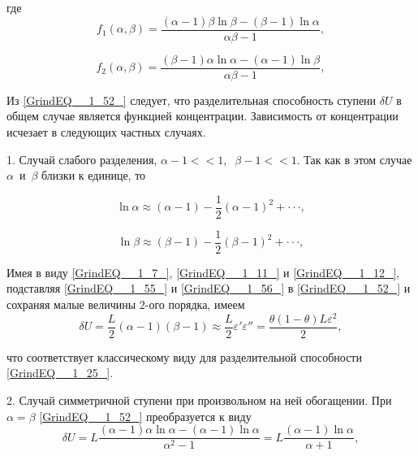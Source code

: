 где
\begin{equation} \label{GrindEQ__1_53_} 
  f_{1} (\alpha ,\beta )=\frac{(\alpha -1)\beta \ln \beta -(\beta -1)\ln \alpha }{\alpha \beta -1} ,  
\end{equation} 

\begin{equation} \label{GrindEQ__1_54_} 
f_{2} (\alpha ,\beta )=\frac{(\beta -1)\alpha \ln \alpha -(\alpha -1)\ln \beta }{\alpha \beta -1} ,  
\end{equation} 

Из \ref{GrindEQ__1_52_} следует, что разделительная способность ступени $\delta U$ в общем случае является функцией концентрации. Зависимость от концентрации исчезает в следующих частных случаях.

1. Случай слабого разделения, $\alpha -1<<1,\; \; \beta -1<<1$. Так как в этом случае $\alpha $~и~$\beta $ близки к единице, то

\begin{equation} \label{GrindEQ__1_55_} 
\ln \alpha \approx (\alpha -1)-\frac{1}{2} (\alpha -1)^{2} +\cdot \cdot \cdot , 
\end{equation} 

\begin{equation} \label{GrindEQ__1_56_} 
\ln \beta \approx (\beta -1)-\frac{1}{2} (\beta -1)^{2} +\cdot \cdot \cdot , 
\end{equation} 

Имея в виду \ref{GrindEQ__1_7_}, \ref{GrindEQ__1_11_} и \ref{GrindEQ__1_12_}, подставляя \ref{GrindEQ__1_55_} и \ref{GrindEQ__1_56_} в \ref{GrindEQ__1_52_} и сохраняя малые величины 2-ого порядка, имеем
\begin{equation} \label{GrindEQ__1_57_} 
\delta U=\frac{L}{2} (\alpha -1)(\beta -1)\approx \frac{L}{2} \varepsilon '\varepsilon ''=\frac{\theta (1-\theta )L\varepsilon ^{2} }{2} ,             
\end{equation} 

что соответствует классическому виду для разделительной способности \ref{GrindEQ__1_25_}.

2. Случай симметричной ступени при произвольном на ней обогащении. При $\alpha =\beta $ \ref{GrindEQ__1_52_} преобразуется к виду
\begin{equation} \label{GrindEQ__1_58_} 
\delta U=L\frac{(\alpha -1)\alpha \ln \alpha -(\alpha -1)\ln \alpha }{\alpha ^{2} -1} =L\frac{(\alpha -1)\ln \alpha }{\alpha +1} ,              
\end{equation} 

